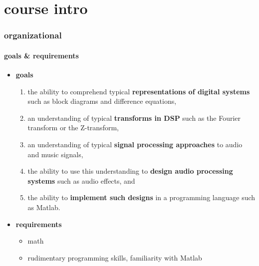     \section{course intro}
        \begin{frame}\frametitle{organizational}\framesubtitle{goals \& requirements}
            \vspace{-3mm}
            \begin{itemize}
                \item	\textbf{goals}
                        \begin{enumerate}
                            \item   the ability to comprehend typical \textbf{representations of digital systems} such as block diagrams and difference equations,
                            \smallskip
                            \item   an understanding of typical \textbf{transforms in DSP} such as the Fourier transform or the Z-transform,
                            \smallskip
                            \item   an understanding of typical \textbf{signal processing approaches} to audio and music signals,
                            \smallskip
                            \item   the ability to use this understanding to \textbf{design audio processing systems} such as audio effects, and
                            \smallskip
                            \item   the ability to \textbf{implement such designs} in a programming language such as Matlab.
                        \end{enumerate}

                \bigskip
                \item<2-> \textbf{requirements}	
                        \begin{itemize}
                            \item	math
                            \item	rudimentary programming skills, familiarity with Matlab
                        \end{itemize}
            \end{itemize}
        \end{frame}
